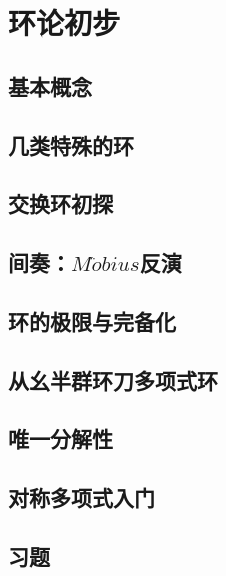 \chapter{环论初步}

\section{基本概念}
\section{几类特殊的环}
\section{交换环初探}
\section{间奏：${M\ddot{o}bius}$反演 }
\section{环的极限与完备化}
\section{从幺半群环刀多项式环}
\section{唯一分解性}
\section{对称多项式入门}
\section{习题}